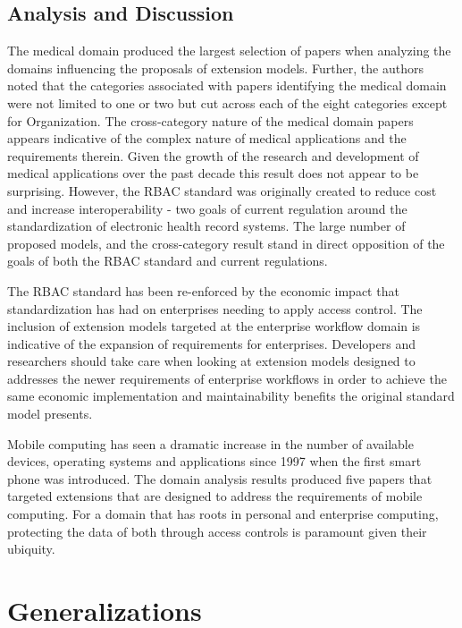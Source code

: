 \subsection{Analysis and Discussion}

The medical domain produced the largest selection of papers when analyzing the domains influencing the proposals of extension models.  
Further, the authors noted that the categories associated with papers identifying the medical domain were not limited to one or two but cut across
each of the eight categories except for Organization. 
The cross-category nature of the medical domain papers appears indicative of the complex nature of medical applications and the requirements therein.
Given the growth of the research and development of medical applications over the past decade this result does not appear to be surprising. However,
the RBAC standard was originally created to reduce cost and increase interoperability - two goals of current regulation around the standardization
of electronic health record systems. The large number of proposed models, and the cross-category result stand in direct opposition of the goals
of both the RBAC standard and current regulations.

The RBAC standard has been re-enforced by the economic impact that standardization has had on enterprises needing to apply access control.  The
inclusion of extension models targeted at the enterprise workflow domain is indicative of the expansion of requirements for enterprises. Developers
and researchers should take care when looking at extension models designed to addresses the newer requirements of enterprise workflows in order to
achieve the same economic implementation and maintainability benefits the original standard model presents.

Mobile computing has seen a dramatic increase in the number of available devices, operating systems and applications since 1997 when the first smart phone
was introduced. 
The domain analysis results produced five papers that targeted extensions that are designed to address the requirements of mobile computing.
For a domain that has roots in personal and enterprise computing, protecting the data of both through access controls is paramount given their ubiquity.


\section{Generalizations} \label{sec:generalizations}

